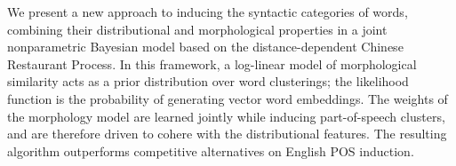 We present a new approach to inducing the syntactic categories of words, combining their distributional and morphological properties in a joint nonparametric Bayesian model based on the distance-dependent Chinese Restaurant Process. In this framework, a log-linear model of morphological similarity acts as a prior distribution over word clusterings; the likelihood function is the probability of generating vector word embeddings. The weights of the morphology model are learned jointly while inducing part-of-speech clusters, and are therefore driven to cohere with the distributional features. The resulting algorithm outperforms competitive alternatives on English POS induction.
